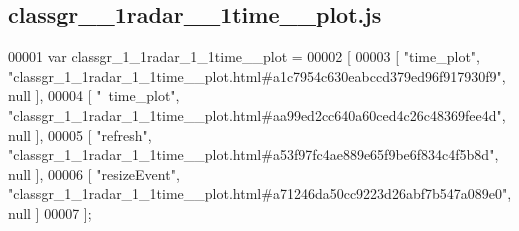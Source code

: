 \subsection{classgr\+\_\+\_\+1radar\+\_\+\_\+1time\+\_\+\+\_\+plot.\+js}
\label{classgr__1__1radar__1__1time____plot_8js_source}

\begin{DoxyCode}
00001 var classgr_1_1radar_1_1time__plot =
00002 [
00003     [ \textcolor{stringliteral}{"time\_plot"}, \textcolor{stringliteral}{"classgr\_1\_1radar\_1\_1time\_\_plot.html#a1c7954c630eabccd379ed96f917930f9"}, null ],
00004     [ \textcolor{stringliteral}{"~time\_plot"}, \textcolor{stringliteral}{"classgr\_1\_1radar\_1\_1time\_\_plot.html#aa99ed2cc640a60ced4c26c48369fee4d"}, null ],
00005     [ \textcolor{stringliteral}{"refresh"}, \textcolor{stringliteral}{"classgr\_1\_1radar\_1\_1time\_\_plot.html#a53f97fc4ae889e65f9be6f834c4f5b8d"}, null ],
00006     [ \textcolor{stringliteral}{"resizeEvent"}, \textcolor{stringliteral}{"classgr\_1\_1radar\_1\_1time\_\_plot.html#a71246da50cc9223d26abf7b547a089e0"}, null ]
00007 ];
\end{DoxyCode}
